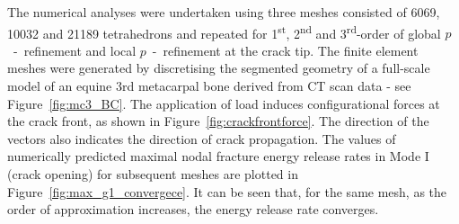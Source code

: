 \documentclass[onecolumn]{svjour3}
\begin{document}
The numerical analyses were undertaken using three meshes consisted of 6069, 10032 and 21189 tetrahedrons and repeated for 1\textsuperscript{st}, 2\textsuperscript{nd} and 3\textsuperscript{rd}-order of global $p$~-~refinement and local $p$~-~refinement at the crack tip. The finite element meshes were generated by discretising the segmented geometry of a full-scale model of an equine 3rd metacarpal bone derived from CT scan data - see Figure~\ref{fig:mc3_BC}.
% 
The application of load induces configurational forces at the crack front, as shown in Figure~\ref{fig:crackfrontforce}. 
The direction of the vectors also indicates the direction of crack propagation.
The values of numerically predicted maximal nodal fracture energy release rates in Mode I (crack opening) for subsequent meshes are plotted in Figure~\ref{fig:max_g1_convergece}. 
It can be seen that, for the same mesh, as the order of approximation increases, the energy release rate converges. 
% 		
\end{document}
